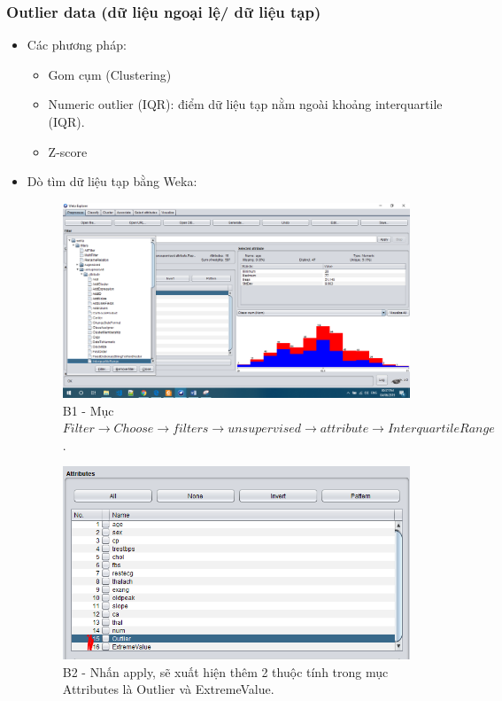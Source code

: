 \subsubsection{Outlier data (dữ liệu ngoại lệ/ dữ liệu tạp)}
\begin{itemize}
\item Các phương pháp:
\begin{itemize}
\item	Gom cụm (Clustering)
\item	Numeric outlier (IQR): điểm dữ liệu tạp nằm ngoài khoảng interquartile (IQR).
\item	Z-score

\end{itemize}
\item Dò tìm dữ liệu tạp bằng Weka:
\begin{figure}[H]
\centering
\includegraphics[width=0.98\textwidth]{4/1.png}
\caption{B1 - Mục $Filter \rightarrow Choose \rightarrow filters \rightarrow unsupervised \rightarrow attribute \rightarrow InterquartileRange$.}
\end{figure}

\begin{figure}[H]
\centering
\includegraphics[width=0.98\textwidth]{4/2.png}
\caption{B2 - Nhấn apply, sẽ xuất hiện thêm 2 thuộc tính trong mục Attributes là Outlier và ExtremeValue.}
\end{figure}


\end{itemize}
